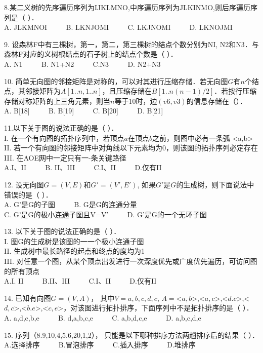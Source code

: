 8.某二义树的先序遍历序列为IJKLMNO,中序遍历序列为JLKINMO,则后序遍历序列是（ ）． \\
A. JLKMNOI $\qquad$ B. LKNJOMI $\qquad$ C. LKJNOMI $\qquad$ D. LKNOJMI

9. 设森林F中有三棵树，第一，第二，第三棵树的结点个数分别为NI, N2和N3．与森林F对应的义树根结点的石子树上的结点个数是（    ）． \\
A. N1 $\qquad$ B. N1+N2 $\qquad$ C.N3 $\qquad$ D. N2+N3

10. 简单无向图的邻接矩阵是对称的，可以对其进行压缩存储．若无向图$G$有$n$个结点，其邻接矩阵为$A[1..n,1..n]$，且压缩存储在$B[1..n(n-1)/2]$．若按行压缩存储对称矩阵的上三角元素，则当$n$等于$10$时，边$(v6, v3)$的信息存储在（）． \\
A. B[18] $\qquad$ B. B[19] $\qquad$ C. B[20] $\qquad$ D. B[21]

11.以下关于图的说法正确的是（    ）． \\
I. 在一个有向图的拓扑序列中，若顶点$a$在顶点$b$之前，则图中必有一条弧 <a,b> \\
II. 若一个有向图的邻接矩阵中对角线以下元素均为0，则该图的拓扑序列必定存在 \\
III. 在AOE网中一定只有一-条关键路径 \\
A.I、II $\qquad$ B. II、III $\qquad$ C.I、II $\qquad$ D.仅有II

12. 设无向图$G=(V, E)$和$G'=(V',E')$, 如果$G'$是$G$的生成树，则下面说法中错误的是（    ）． \\
A. G'是G的子图 $\qquad$ B. G是G的连通分量 \\
C. G’是G的极小连通子图且V=V' $\qquad$ D. G'是G的一个无环子图

13. 以下关于图的说法正确的是（    ）． \\
I. 图G的生成树是该图的一一个极小连通子图 \\
II. 生成树中最长路径的起点和终点的度均为1 \\
III. 对任意一个图，从某个顶点出发进行一次深度优先或广度优先遍历，可访问图的所有顶点 \\
A.I. II $\qquad$ B.II、III $\qquad$ C.I、II $\qquad$ D.仅有II

14. 已知有向图$G=(V,A)$， 其中$V=${$a,b,c,d,c$}, $A=${<$a,b$>,<$a,c$>,<$d.c$>,<$d,c$>,<$b.e$>,<$c,e$>}，对该图进行拓扑排序，下面序列中不是拓扑排序的是（    ）． \\
A. a,d,c,b,e $\qquad$ B. d,a,b,c,e $\qquad$ C. a,b,d,c,e $\qquad$ D. a,b,c,d,e

15. 序列（8.9,10,4,5.6,20,1,2）， 只能是以下哪种排序方法两趟排序后的结果（    ）． \\
A.选择排序 $\qquad$ B.冒泡排序 $\qquad$ C.插入排序 $\qquad$ D.堆排序

